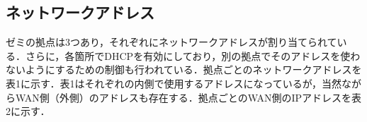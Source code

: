 \documentclass[11pt]{jarticle}
\begin{document}


\subsection{ネットワークアドレス}
ゼミの拠点は3つあり，それぞれにネットワークアドレスが割り当てられている．さらに，各箇所でDHCPを有効にしており，別の拠点でそのアドレスを使わないようにするための制御も行われている．拠点ごとのネットワークアドレスを表1に示す．表1はそれぞれの内側で使用するアドレスになっているが，当然ながらWAN側（外側）のアドレスも存在する．拠点ごとのWAN側のIPアドレスを表2に示す．
\end{document}

